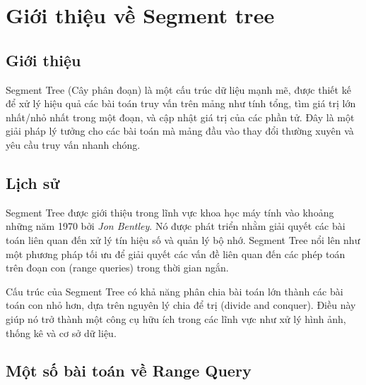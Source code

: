 \documentclass[a4paper]{article}
\begin{document}
\pagebreak
\tableofcontents
\pagebreak

\printunsrtglossary[type={symbols}, title={List of Symbols}]
\printunsrtglossary[type={abbreviations}, title={List of Acronyms}]
\pagebreak
\listoffigures
\listoftables
\pagebreak
{}




\pagebreak


\section{Giới thiệu về Segment tree}
\subsection{Giới thiệu}
\hspace{0.5cm}Segment Tree (Cây phân đoạn) là một cấu trúc dữ liệu mạnh mẽ, được thiết kế để xử lý hiệu quả các bài toán truy vấn trên mảng như tính tổng, tìm giá trị lớn nhất/nhỏ nhất trong một đoạn, và cập nhật giá trị của các phần tử. Đây là một giải pháp lý tưởng cho các bài toán mà mảng đầu vào thay đổi thường xuyên và yêu cầu truy vấn nhanh chóng.\medskip

\subsection{Lịch sử}
\hspace{0.5cm}Segment Tree được giới thiệu trong lĩnh vực khoa học máy tính vào khoảng những năm 1970 bởi \textit{Jon Bentley}. Nó được phát triển nhằm giải quyết các bài toán liên quan đến xử lý tín hiệu số và quản lý bộ nhớ. Segment Tree nổi lên như một phương pháp tối ưu để giải quyết các vấn đề liên quan đến các phép toán trên đoạn con (range queries) trong thời gian ngắn.\medskip

Cấu trúc của Segment Tree có khả năng phân chia bài toán lớn thành các bài toán con nhỏ hơn, dựa trên nguyên lý chia để trị (divide and conquer). Điều này giúp nó trở thành một công cụ hữu ích trong các lĩnh vực như xử lý hình ảnh, thống kê và cơ sở dữ liệu.

\subsection{Một số bài toán về Range Query}
\end{document}
